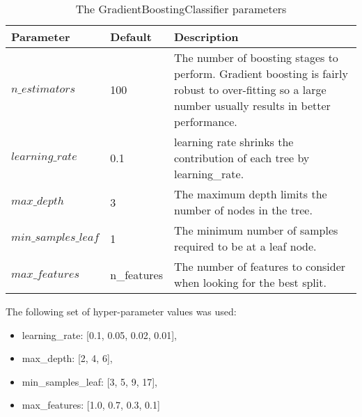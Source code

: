 \begin{table}[h!]
	\caption{The GradientBoostingClassifier parameters}
	\begin{tabular}{ | l | l | p{7cm} |}
		\hline
		\textbf{Parameter} & \textbf{Default} & \textbf{Description}\\
		\hline
		$n\_estimators$ & 100 & The number of boosting stages to perform. Gradient boosting is fairly robust to over-fitting so a large number usually results in better performance.\\
		\hline
		$learning\_rate$ & 0.1 & learning rate shrinks the contribution of each tree by learning\_rate.\\
		\hline
		$max\_depth$ & 3 & The maximum depth limits the number of nodes in the tree.\\
		\hline
		$min\_samples\_leaf$ & 1 & The minimum number of samples required to be at a leaf node.\\
		\hline
		$max\_features$ & n\_features & The number of features to consider when looking for the best split.\\
		\hline
	\end{tabular}
	\label{table:GBdefaults}
\end{table}
The following set of hyper-parameter values was used:
\begin{itemize}
	\item learning\_rate: [0.1, 0.05, 0.02, 0.01],
	\item max\_depth: [2, 4, 6],
	\item min\_samples\_leaf: [3, 5, 9, 17],
	\item max\_features: [1.0, 0.7, 0.3, 0.1]
\end{itemize}
